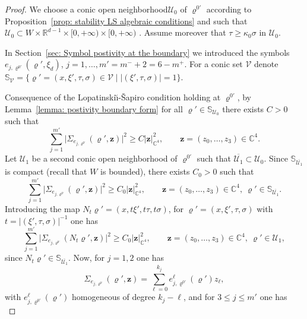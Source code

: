 \documentclass[JEP,XML,SOM,Unicode,published]{cedram}
\let\sep\mid
\theoremstyle{plain}
\theoremstyle{definition}
\def\R{\mathbb{R}}
\def\C{\mathbb{C}}
\newcommand{\LS}{Lopatinski\u{\i}-\v{S}apiro\xspace}
\newcommand{\nhd}{neighborhood\xspace}
\let\k\kappa
\let\y\varrho
\newcommand{\ovl}[1]{\overline{#1}}
\newcommand{\un}[1]{\Sigma_{#1}}
\newcommand{\U}{\mathscr U}
\newcommand{\V}{\mathscr V}
\newcommand{\z}{\boldsymbol{z}}
\begin{document}
\begin{proof}
We choose a conic open \nhd $\U_0$ of $\y^{0\prime}$ according to
Proposition~\ref{prop: stability LS algebraic conditions} and such that $\U_0 \subset W \times \R^{d-1}
\times [0,+\infty) \times [0,+\infty)$ . Assume
moreover that $\tau \geq \k_0 \sigma$ in $\U_0$.

In Section~\ref{sec: Symbol postivity at the boundary} we introduced
the symbols $e_{j, \y^{0\prime}} (\y', \xi_d)$, $j=1, \dots, m' = m^-
+2 = 6 - m^+$.
For a conic set $\V$ denote $\mathbb S_{\V} = \{ \y' = (x,\xi', \tau,\sigma) \in \V\sep |(\xi', \tau,\sigma)|=1\}$.

Consequence of the \LS condition holding at
$\y^{0\prime}$, by
Lemma~\ref{lemma: postivity boundary form} for all $\y' \in \mathbb S_{\U_0}$ there exists $C>0$ such
that\vspace*{-3pt}
\begin{equation*}
\sum_{j=1}^{m'} \big|\un{e_{j, \y^{0\prime}}} (\y', \z)\big|^2 \geq
C |\z|_{\C^{4}}^2,
\qquad \z = (z_0, \dots, z_3) \in \C^{4}.
\end{equation*}
Let $\U_1$ be a second conic open \nhd of $\y^{0\prime}$ such that
$\ovl{\U_1} \subset \U_0$.
Since $\mathbb S_{\ovl{\U_1}}$ is compact (recall that $W$ is bounded), there exists $C_0>0$ such that\vspace*{-4pt}
\begin{equation*}
\sum_{j=1}^{m'} \big|\un{e_{j, \y^{0\prime}}} (\y', \z)\big|^2 \geq
C_0 |\z|_{\C^{4}}^2,
\qquad \z = (z_0, \dots, z_3) \in \C^{4}, \ \y' \in \mathbb S_{\ovl{\U_1}}.
\end{equation*}
Introducing the map $N_{t}\y'=(x, t \xi', t \tau, t \sigma)$, for
$\y'=(x, \xi', \tau, \sigma)$ with $t = |(\xi', \tau,\sigma)|^{-1}$
one has\vspace*{-4pt}
\begin{equation}
\label{eq: symbol positivity 1}
\sum_{j=1}^{m'} \big|\un{e_{j, \y^{0\prime}}} (N_t \y', \z)\big|^2 \geq
C_0 |\z|_{\C^{4}}^2,
\qquad \z = (z_0, \dots, z_3) \in \C^{4}, \ \y' \in \U_1,
\end{equation}
since $N_t \y' \in \mathbb S_{\ovl{\U_1}}$.
Now, for $j=1,2$ one has
\begin{equation*}
\un{e_{j, \y^{0\prime}}} (\y', \z)= \sum_{\ell=0}^{k_j} e_{j,
\y^{0\prime}}^\ell (\y') z_\ell,
\end{equation*}
with $ e_{j, \y^{0\prime}}^\ell (\y')$ homogeneous of degree
$k_j-\ell$,
and for $3\leq j \leq m'$ one has
\begin{equation*}

\end{equation*}
\end{proof}
\end{document}
